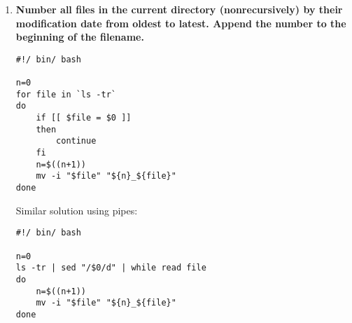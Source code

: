 \documentclass[12pt,a4paper]{article}
\begin{document}
\begin{enumerate}[label=\textbf{\arabic*}.]

\item \textbf{Number all files in the current directory (nonrecursively) by their modification date from oldest to latest. Append the number to the beginning of the filename.}

\begin{lstlisting}
#!/ bin/ bash

n=0
for file in `ls -tr`
do
	if [[ $file = $0 ]]
	then
		continue
	fi
	n=$((n+1))
	mv -i "$file" "${n}_${file}"
done
\end{lstlisting}

Similar solution using pipes:

\begin{lstlisting}
#!/ bin/ bash

n=0
ls -tr | sed "/$0/d" | while read file
do
	n=$((n+1))
	mv -i "$file" "${n}_${file}"
done
\end{lstlisting}


\end{enumerate}
\end{document}
